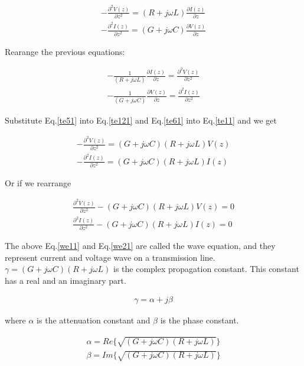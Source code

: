 \documentclass{ximera}
\begin{document}
\begin{eqnarray}
-\frac{\partial^2 V(z)}{\partial z^2}=  (R+j\omega L) \frac{\partial
 I(z)}{\partial z}  \label{teleg3} \\
-\frac{\partial^2 I(z)}{\partial z^2}=  (G+j\omega C) \frac{\partial
 V(z)}{\partial z} \label{teleg4}
\end{eqnarray}

Rearange the previous equations:



\begin{eqnarray}
- \frac{1}{ (R+j\omega L)} \frac{\partial I(z)}{\partial z}= \frac{\partial^2
  V(z)}{\partial z^2} \label{te51} \\
-\frac{1}{ (G+j\omega C)} \frac{\partial V(z)}{\partial z}= \frac{\partial^2
  I(z)}{\partial z^2} \label{te61}
\end{eqnarray}

Substitute  Eq.\ref{te51} into  Eq.\ref{te121}
and Eq.\ref{te61} into Eq.\ref{te11} and we get

\begin{eqnarray}
-\frac{\partial^2 V(z)}{\partial z^2}=(G+j\omega C)(R+j\omega L) V(z) \label{teleg1} \\
-\frac{\partial^2 I(z)}{\partial z^2}= (G+j\omega C)  (R+j\omega L) \label{teleg2}
I(z) 
\end{eqnarray}

Or if we rearrange


\begin{eqnarray}
\frac{\partial^2 V(z)}{\partial z^2} -(G+j\omega C)(R+j\omega L)
 V(z)=0  \label{we11} \\ 
\frac{\partial^2 I(z)}{\partial z^2}- (G+j\omega C)  (R+j\omega L)
I(z)=0 \label{we21}
\end{eqnarray}

The above Eq.\ref{we11} and Eq.\ref{we21} are called the wave equation, and  they represent
current and voltage wave on a transmission line. $\gamma=(G+j\omega
C)(R+j\omega L)$ is the complex propagation constant. This constant
has a real and an imaginary part.

\begin{eqnarray}
\gamma= \alpha + j \beta \nonumber
\end{eqnarray}

where $\alpha$ is the attenuation constant and $\beta$ is the phase
constant.

\begin{eqnarray}
\alpha=Re\{ \sqrt{(G+j\omega C)  (R+j\omega L)  }  \} \nonumber \\ \nonumber
\beta = Im\{ \sqrt{(G+j\omega C)  (R+j\omega L)  }  \}
\end{eqnarray}
\end{document}

